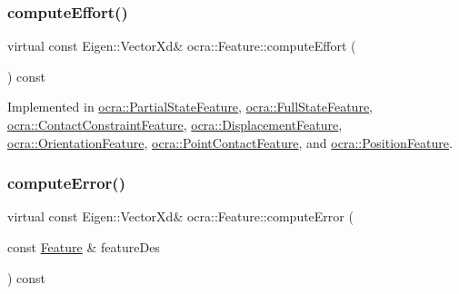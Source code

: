 \hypertarget{classocra_1_1Feature_ae43f2ffc54862d6ddc0b02fd39431eb6}{}\label{classocra_1_1Feature_ae43f2ffc54862d6ddc0b02fd39431eb6} 
\subsubsection{\texorpdfstring{compute\+Effort()}{computeEffort()}\hspace{0.1cm}{\footnotesize\ttfamily [2/2]}}
{\footnotesize\ttfamily virtual const Eigen\+::\+Vector\+Xd\& ocra\+::\+Feature\+::compute\+Effort (\begin{DoxyParamCaption}{ }\end{DoxyParamCaption}) const\hspace{0.3cm}{\ttfamily [pure virtual]}}



Implemented in \hyperlink{classocra_1_1PartialStateFeature_abc447a46a7bb1b4480af965119d23214}{ocra\+::\+Partial\+State\+Feature}, \hyperlink{classocra_1_1FullStateFeature_a65b58a3fac72eab7f9bd18cb20775798}{ocra\+::\+Full\+State\+Feature}, \hyperlink{classocra_1_1ContactConstraintFeature_a84b467c5da2810bef8a76525e617ad2d}{ocra\+::\+Contact\+Constraint\+Feature}, \hyperlink{classocra_1_1DisplacementFeature_aee1c2f5af98c28e8d6ab3dbeb5c3c297}{ocra\+::\+Displacement\+Feature}, \hyperlink{classocra_1_1OrientationFeature_aa2d2bee82d7c9bef9f565e328204a2f2}{ocra\+::\+Orientation\+Feature}, \hyperlink{classocra_1_1PointContactFeature_ad925987e17dcfa0f8157deff33b9d311}{ocra\+::\+Point\+Contact\+Feature}, and \hyperlink{classocra_1_1PositionFeature_a31fda0cc674bf08b067c12af39c5fbdd}{ocra\+::\+Position\+Feature}.

\hypertarget{classocra_1_1Feature_aaa74d6869f7e574fcc39d443581ddf77}{}\label{classocra_1_1Feature_aaa74d6869f7e574fcc39d443581ddf77} 
\subsubsection{\texorpdfstring{compute\+Error()}{computeError()}\hspace{0.1cm}{\footnotesize\ttfamily [1/2]}}
{\footnotesize\ttfamily virtual const Eigen\+::\+Vector\+Xd\& ocra\+::\+Feature\+::compute\+Error (\begin{DoxyParamCaption}\item[{const \hyperlink{classocra_1_1Feature}{Feature} \&}]{feature\+Des }\end{DoxyParamCaption}) const\hspace{0.3cm}{\ttfamily [pure virtual]}}



